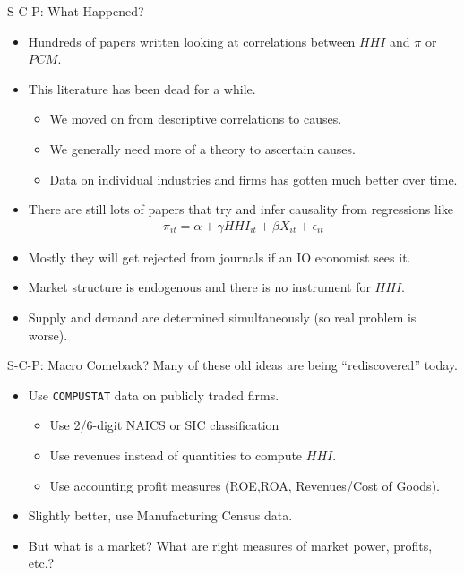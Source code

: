 \documentclass[aspectratio=169,11pt]{beamer}
\begin{document}
\begin{frame}{S-C-P: What Happened?}
\begin{itemize}
\item Hundreds of papers written looking at correlations between $HHI$ and $\pi$ or $PCM$.
\item This literature has been dead for a while.
\begin{itemize}
\item We moved on from descriptive correlations to causes.
\item We generally need more of a theory to ascertain causes.
\item Data on individual industries and firms has gotten much better over time.
\end{itemize}
\item There are still lots of papers that try and infer causality from regressions like 
\begin{eqnarray*}
\pi_{it} = \alpha + \gamma HHI_{it} + \beta X_{it} + \epsilon_{it} 
\end{eqnarray*}
\item Mostly they will get rejected from journals if an IO economist sees it.
\item Market structure is \alert{endogenous} and there is no instrument for $HHI$.
\item Supply and demand are determined \alert{simultaneously} (so real problem is worse).
\end{itemize}
\end{frame}


\begin{frame}{S-C-P: Macro Comeback?}
Many of these old ideas are being ``rediscovered'' today.
\begin{itemize}
\item Use \texttt{COMPUSTAT} data on publicly traded firms.
\begin{itemize}
\item Use 2/6-digit NAICS or SIC classification
\item Use revenues instead of quantities to compute $HHI$.
\item Use accounting profit measures (ROE,ROA, Revenues/Cost of Goods).
\end{itemize}
\item Slightly better, use Manufacturing Census data.
\item But what is a market? What are right measures of market power, profits, etc.?
\end{itemize}
\end{frame}
\end{document}
